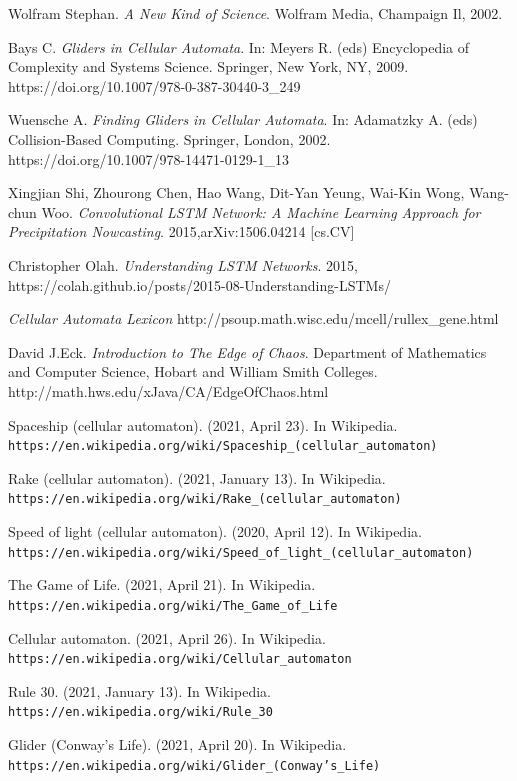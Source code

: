 \documentclass[12pt]{article}
\numberwithin{figure}{section} %
\begin{document}
\newpage

\begin{thebibliography}{9}
Wolfram Stephan.
\textit{A New Kind of Science}. 
Wolfram Media, Champaign Il, 2002. 

Bays C.
\textit{Gliders in Cellular Automata}. 
In: Meyers R. (eds) Encyclopedia of Complexity and Systems Science. Springer, New York, NY, 2009.
https://doi.org/10.1007/978-0-387-30440-3\_249

Wuensche A.
\textit{Finding Gliders in Cellular Automata}. 
In: Adamatzky A. (eds) Collision-Based Computing. Springer, London, 2002. 
https://doi.org/10.1007/978-14471-0129-1\_13

Xingjian Shi, Zhourong Chen, Hao Wang, Dit-Yan Yeung, Wai-Kin Wong, Wang-chun Woo. 
\textit{Convolutional LSTM Network: A Machine Learning Approach for Precipitation Nowcasting}. 
2015,arXiv:1506.04214 [cs.CV]

Christopher Olah.
\textit{Understanding LSTM Networks}. 
2015, https://colah.github.io/posts/2015-08-Understanding-LSTMs/

\textit{Cellular Automata Lexicon}
http://psoup.math.wisc.edu/mcell/rullex\_gene.html

David J.Eck.
\textit{Introduction to The Edge of Chaos}.
Department of Mathematics and Computer Science, Hobart and William Smith Colleges. 
http://math.hws.edu/xJava/CA/EdgeOfChaos.html
 
Spaceship (cellular automaton). (2021, April 23). In Wikipedia.
\\\texttt{https://en.wikipedia.org/wiki/Spaceship\_(cellular\_automaton)}

Rake (cellular automaton). (2021, January 13). In Wikipedia.
\\\texttt{https://en.wikipedia.org/wiki/Rake\_(cellular\_automaton)}

Speed of light (cellular automaton). (2020, April 12). In Wikipedia.
\\\texttt{https://en.wikipedia.org/wiki/Speed\_of\_light\_(cellular\_automaton)}

The Game of Life. (2021, April 21). In Wikipedia. 
\\\texttt{https://en.wikipedia.org/wiki/The\_Game\_of\_Life}

Cellular automaton. (2021, April 26). In Wikipedia. 
\\\texttt{https://en.wikipedia.org/wiki/Cellular\_automaton}

Rule 30. (2021, January 13). In Wikipedia. 
\\\texttt{https://en.wikipedia.org/wiki/Rule\_30}

Glider (Conway’s Life). (2021, April 20). In Wikipedia. 
\\\texttt{https://en.wikipedia.org/wiki/Glider\_(Conway’s\_Life)}

\end{thebibliography}
\end{document}

